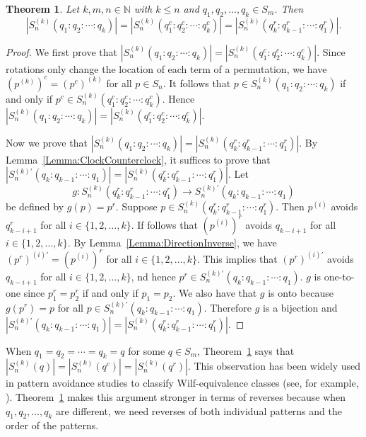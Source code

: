 \documentclass[11pt]{article}
\newtheorem{theorem}{Theorem}[section]
\theoremstyle{definition}
\numberwithin{equation}{section}
\begin{document}
\begin{theorem}\label{Theorem:ComplementReverse}
Let $k,m,n\in\mathbb{N}$ with $k\leq n$ and $q_1,q_2,\ldots,q_k\in S_m$. Then
    \[
    |S_n^{(k)}(q_1:q_2:\cdots:q_k)|=|S_n^{(k)}(q_1^c:q_2^c:\cdots:q_k^c)|=|S_n^{(k)}(q_k^r:q_{k-1}^r:\cdots:q_1^r)|.
    \]
\end{theorem}

\begin{proof}
We first prove that $|S_n^{(k)}(q_1:q_2:\cdots:q_k)|=|S_n^{(k)}(q_1^c:q_2^c:\cdots:q_k^c)|$. Since rotations only change the location of each term of a permutation, we have $\left(p^{(k)}\right)^c=\left(p^c\right)^{(k)}$ for all $p\in S_n$. It follows that $p\in S_n^{(k)}(q_1:q_2:\cdots:q_k)$ if and only if $p^c\in S_n^{(k)}(q_1^c:q_2^c:\cdots:q_k^c)$. Hence $|S_n^{(k)}(q_1:q_2:\cdots:q_k)|=|S_n^{(k)}(q_1^c:q_2^c:\cdots:q_k^c)|$.

Now we prove that $|S_n^{(k)}(q_1:q_2:\cdots:q_k)|=|S_n^{(k)}(q_k^r:q_{k-1}^r:\cdots:q_1^r)|$. By Lemma~\ref{Lemma:ClockCounterclock}, it suffices to prove that $|S_n^{(k)'}(q_k:q_{k-1}:\cdots:q_1)|=|S_n^{(k)}(q_k^r:q_{k-1}^r:\cdots:q_1^r)|$. Let \[g:S_n^{(k)}(q_k^r:q_{k-1}^r:\cdots:q_1^r)\to S_n^{(k)'}(q_k:q_{k-1}:\cdots:q_1)\] 
be defined by 
$g(p)=p^r$. Suppose $p\in S_n^{(k)}(q_k^r:q_{k-1}^r:\cdots:q_1^r)$. Then $p^{(i)}$ avoids $q_{k-i+1}^r$ for all $i\in\{1,2,\ldots,k\}$. If follows that $(p^{(i)})^r$ avoids $q_{k-i+1}$ for all $i\in\{1,2,\ldots,k\}$. By Lemma~\ref{Lemma:DirectionInverse}, we have $(p^r)^{(i)'}=(p^{(i)})^r$ for all $i\in\{1,2,\ldots,k\}$. This implies that $(p^r)^{(i)'}$ avoids $q_{k-i+1}$ for all $i\in\{1,2,\ldots,k\}$, nd 
hence  $p^r\in S_n^{(k)'}(q_k:q_{k-1}:\cdots:q_1)$. $g$ is one-to-one since  $p_1^r=p_2^r$ if and only if $p_1=p_2$. We also have that $g$ is onto because $g(p^r)=p$ for all $p\in S_n^{(k)'}(q_k:q_{k-1}:\cdots:q_1)$. 
Therefore $g$ is a bijection and $|S_n^{(k)'}(q_k:q_{k-1}:\cdots:q_1)|=|S_n^{(k)}(q_k^r:q_{k-1}^r:\cdots:q_1^r)|$.
\end{proof}

When $q_1=q_2=\cdots=q_k=q$ for some $q\in S_m$, Theorem~\ref{Theorem:ComplementReverse} says that $|S_n^{(k)}(q)|=|S_n^{(k)}(q^c)|=|S_n^{(k)}(q^r)|$. This observation has been widely used in pattern avoidance studies to classify Wilf-equivalence classes (see, for example, \cite[p.~151]{Bona2022}). Theorem~\ref{Theorem:ComplementReverse} 
makes this argument stronger in terms of reverses because when $q_1,q_2,\ldots,q_k$ are different, we need reverses of both individual patterns and the order of the patterns.
\end{document}
